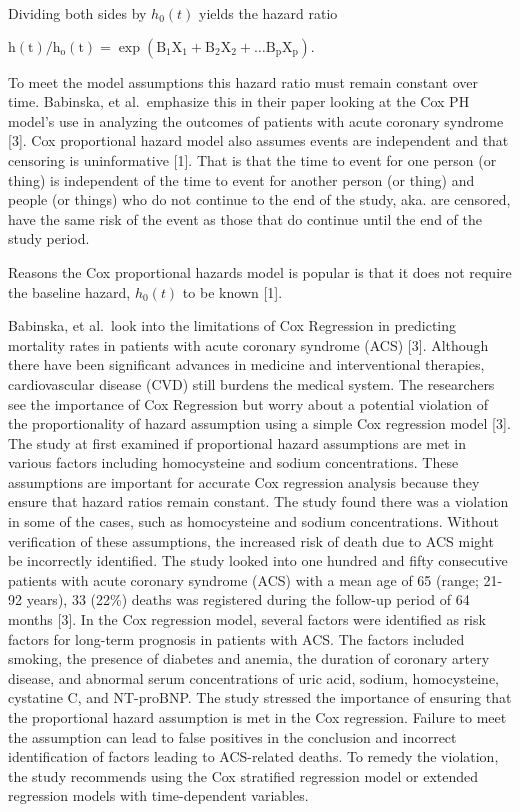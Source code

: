 \documentclass[
  letterpaper,
  DIV=11,
  numbers=noendperiod]{scrreprt}
\begin{document}
Dividing both sides by \(h_0(t)\) yields the hazard ratio

\(\mathrm{h}(\mathrm{t}) / \mathrm{h}_{\mathrm{o}}(\mathrm{t})=\exp \left(\mathrm{B}_1 \mathrm{X}_1+\mathrm{B}_2 \mathrm{X}_2+\ldots \mathrm{B}_{\mathrm{p}} \mathrm{X}_{\mathrm{p}}\right) \text {. }\)

To meet the model assumptions this hazard ratio must remain constant
over time. Babinska, et al.~emphasize this in their paper looking at the
Cox PH model's use in analyzing the outcomes of patients with acute
coronary syndrome {[}3{]}. Cox proportional hazard model also assumes
events are independent and that censoring is uninformative {[}1{]}. That
is that the time to event for one person (or thing) is independent of
the time to event for another person (or thing) and people (or things)
who do not continue to the end of the study, aka. are censored, have the
same risk of the event as those that do continue until the end of the
study period.

Reasons the Cox proportional hazards model is popular is that it does
not require the baseline hazard, \(h_0(t)\) to be known {[}1{]}.

Babinska, et al.~look into the limitations of Cox Regression in
predicting mortality rates in patients with acute coronary syndrome
(ACS) {[}3{]}. Although there have been significant advances in medicine
and interventional therapies, cardiovascular disease (CVD) still burdens
the medical system. The researchers see the importance of Cox Regression
but worry about a potential violation of the proportionality of hazard
assumption using a simple Cox regression model {[}3{]}. The study at
first examined if proportional hazard assumptions are met in various
factors including homocysteine and sodium concentrations. These
assumptions are important for accurate Cox regression analysis because
they ensure that hazard ratios remain constant. The study found there
was a violation in some of the cases, such as homocysteine and sodium
concentrations. Without verification of these assumptions, the increased
risk of death due to ACS might be incorrectly identified. The study
looked into one hundred and fifty consecutive patients with acute
coronary syndrome (ACS) with a mean age of 65 (range; 21-92 years), 33
(22\%) deaths was registered during the follow-up period of 64 months
{[}3{]}. In the Cox regression model, several factors were identified as
risk factors for long-term prognosis in patients with ACS. The factors
included smoking, the presence of diabetes and anemia, the duration of
coronary artery disease, and abnormal serum concentrations of uric acid,
sodium, homocysteine, cystatine C, and NT-proBNP. The study stressed the
importance of ensuring that the proportional hazard assumption is met in
the Cox regression. Failure to meet the assumption can lead to false
positives in the conclusion and incorrect identification of factors
leading to ACS-related deaths. To remedy the violation, the study
recommends using the Cox stratified regression model or extended
regression models with time-dependent variables.
\end{document}
